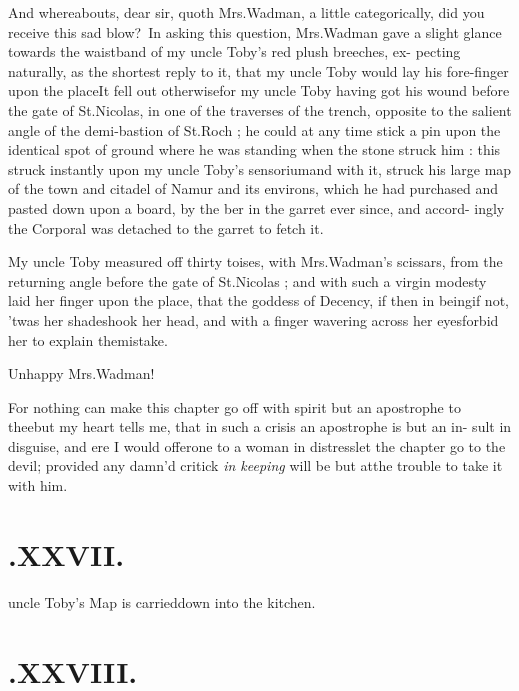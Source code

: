 \documentclass{article}
\begin{document}
\tsk And whereabouts, dear sir, quoth Mrs.\@ Wadman, a
little categorically, did you receive this sad
blow?\tsk\ In asking this question, Mrs.\@ Wadman gave
a slight glance towards the waistband of my uncle
Toby’s red plush breeches, ex- pecting naturally, as the
shortest reply to it, that my uncle Toby would lay his
fore-finger upon the place\tsh It fell out
otherwise\tsh for my uncle Toby having got his wound before the gate of St.\@ Nicolas,
in one of the traverses of the trench, opposite to the salient angle
of the demi-bastion of St.\@ Roch ; he could at any time stick a
pin upon the identical spot of ground where he was standing when
the stone struck him : this struck instantly upon my uncle
Toby’s sensorium\tsh and with it, struck his
large map of the town and citadel of Namur and its environs,
which he had purchased and pasted down upon a board, by the\break
{}
ber in the garret ever since, and accord-\etp{} ingly the Corporal was detached to the garret to fetch
it.

My uncle Toby measured off thirty toises, with 
Mrs.\@ Wadman’s scissars, from the returning angle before the
gate of St.\@ Nicolas ; and with such a virgin modesty laid her
finger upon the place, that the goddess of Decency, if then in
being\tsk if not, ’twas her shade\tsk shook her head, and
with a finger wavering across her eyes\tsk forbid her to explain
the\break mistake.

Unhappy Mrs.\@ Wadman!\tsh

\tsh For nothing can make this chapter go off with
spirit but an apostrophe to thee\tsh but my heart tells
me, that in such a crisis an apostrophe is but an in- sult in
disguise, and ere I would offer\break one to a woman in
distress\tsk let the chapter go to the devil; provided any
damn’d critick \textit{in keeping} will be but at\break the trouble to
take it with him.


\vfill{}\eject
\null\vfill
\section{.\enspace XXVII.}

 uncle Toby’s Map is
carried\break down into the kitchen.

\vfill
{}\eject
\null{}\baselineskip
\section{.\enspace XXVIII.}
\end{document}
